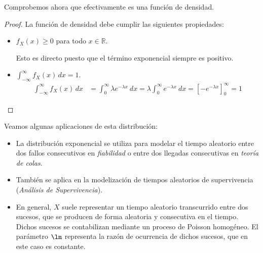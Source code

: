 Comprobemos ahora que efectivamente es una función de densidad.
\begin{proof}
    La función de densidad debe cumplir las siguientes propiedades:
    \begin{itemize}
        \item $f_X(x)\geq 0$ para todo $x\in \mathbb{R}$.
        
        Esto es directo puesto que el término exponencial siempre es positivo.
        
        \item $\displaystyle \int_{-\infty}^{\infty} f_X(x) \, dx = 1$.
        \begin{align*}
            \int_{-\infty}^{\infty} f_X(x) \, dx &= \int_{0}^{\infty} \lambda e^{-\lambda x}~dx = \lambda \int_{0}^{\infty} e^{-\lambda x}~dx = \left[ -e^{-\lambda x} \right]_{0}^{\infty}
            = 1
        \end{align*}
    \end{itemize}
\end{proof}

Veamos algunas aplicaciones de esta distribución:
\begin{itemize}
    \item La distribución exponencial se utiliza para modelar el tiempo aleatorio entre dos fallos consecutivos en \emph{fiabilidad}
    o entre dos llegadas consecutivas en \emph{teoría de colas}.

    \item También se aplica en la modelización de tiempos aleatorios de supervivencia (\emph{Análisis de Supervivencia}).
    
    \item En general, $X$ suele representar un tiempo aleatorio transcurrido entre dos
    sucesos, que se producen de forma aleatoria y consecutiva en el tiempo.
    Dichos sucesos se contabilizan mediante un proceso de Poisson homogéneo.
    El parámetro $\lm$ representa la razón de ocurrencia de dichos sucesos, que
    en este caso es constante.
\end{itemize}

